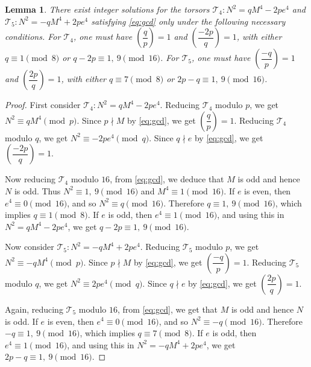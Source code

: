 \documentclass[12pt]{amsart}
\newcommand{\cT}{\mathcal{T}}
\numberwithin{equation}{section}
\newtheorem{lem}{Lemma}[section]
\theoremstyle{definition}
\begin{document}
\begin{lem}
\label{lem:T45}
There exist integer solutions for the torsors $\cT_{4}: N^{2}=qM^{4}-2pe^{4}$ and $\cT_{5}: N^{2}=-qM^{4}+2pe^{4}$ satisfying \eqref{eq:gcd} only under the following necessary conditions. For $\cT_{4}$, one must have $\left(\dfrac{q}{p}\right)=1$ and $\left(\dfrac{-2p}{q}\right)=1$, with either $q\equiv 1\pmod 8$ or $q-2p\equiv 1,~9\pmod {16}$. For $\cT_{5}$, one must have $\left(\dfrac{-q}{p}\right)=1$ and $\left(\dfrac{2p}{q}\right)=1$, with either $q\equiv 7\pmod 8$ or $2p-q\equiv 1,~9\pmod {16}$.
\end{lem}

\begin{proof}
First consider $\cT_{4}: N^{2}=qM^{4}-2pe^{4}$. Reducing $\cT_{4}$ modulo $p$, we get $N^{2}\equiv qM^{4}\pmod p$. Since $p\nmid M$ by \eqref{eq:gcd}, we get $\left(\dfrac{q}{p}\right)=1$. Reducing $\cT_{4}$ modulo $q$, we get $N^{2}\equiv -2pe^{4}\pmod q$. Since $q\nmid e$ by \eqref{eq:gcd}, we get $\left(\dfrac{-2p}{q}\right)=1$.

Now reducing $\cT_{4}$ modulo $16$, from \eqref{eq:gcd}, we deduce that $M$ is odd and hence $N$ is odd. Thus $N^{2}\equiv 1,~9\pmod {16}$ and $M^{4}\equiv 1\pmod {16}$. If $e$ is even, then $e^{4}\equiv 0\pmod {16}$, and so $N^{2}\equiv q\pmod {16}$. Therefore $q\equiv 1,~9\pmod {16}$, which implies $q\equiv 1\pmod 8$. If $e$ is odd, then $e^{4}\equiv 1\pmod {16}$, and using this in $N^{2}=qM^{4}-2pe^{4}$, we get $q-2p\equiv 1,~9\pmod {16}$.

Now consider $\cT_{5}: N^{2}=-qM^{4}+2pe^{4}$. Reducing $\cT_{5}$ modulo $p$, we get $N^{2}\equiv -qM^{4}\pmod p$. Since $p\nmid M$ by \eqref{eq:gcd}, we get $\left(\dfrac{-q}{p}\right)=1$. Reducing $\cT_{5}$ modulo $q$, we get $N^{2}\equiv 2pe^{4}\pmod q$. Since $q\nmid e$ by \eqref{eq:gcd}, we get $\left(\dfrac{2p}{q}\right)=1$.

Again, reducing $\cT_{5}$ modulo $16$, from \eqref{eq:gcd}, we get that $M$ is odd and hence $N$ is odd. If $e$ is even, then $e^{4}\equiv 0\pmod {16}$, and so $N^{2}\equiv -q\pmod {16}$. Therefore $-q\equiv 1,~9\pmod {16}$, which implies $q\equiv 7\pmod 8$. If $e$ is odd, then $e^{4}\equiv 1\pmod {16}$, and using this in $N^{2}=-qM^{4}+2pe^{4}$, we get $2p-q\equiv 1,~9\pmod {16}$.
\end{proof}





\end{document}
